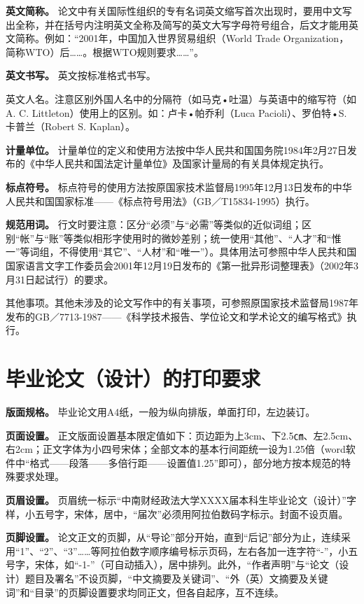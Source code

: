 \documentclass[singlesided]{Style/ucasthesis}%
\begin{document}
\textbf{英文简称。} 论文中有关国际性组织的专有名词英文缩写首次出现时，要用中文写出全称，并在括号内注明英文全称及简写的英文大写字母符号组合，后文才能用英文简称。例如：``2001年，中国加入世界贸易组织（World Trade Organization，简称WTO）后\ldots{}\ldots{}。根据WTO规则要求\ldots{}\ldots{}''。

\textbf{英文书写。} 英文按标准格式书写。

英文人名。注意区别外国人名中的分隔符（如马克•吐温）与英语中的缩写符（如A. C. Littleton）使用上的区别。如：卢卡•帕乔利（Luca Pacioli）、罗伯特•S. 卡普兰（Robert S. Kaplan）。

\textbf{计量单位。} 计量单位的定义和使用方法按中华人民共和国国务院1984年2月27日发布的《中华人民共和国法定计量单位》及国家计量局的有关具体规定执行。

\textbf{标点符号。} 标点符号的使用方法按原国家技术监督局1995年12月13日发布的中华人民共和国国家标准------《标点符号用法》（GB／T15834-1995）执行。

\textbf{规范用词。} 行文时要注意：区分``必须''与``必需''等类似的近似词组；区别``帐''与``账''等类似相形字使用时的微妙差别；统一使用``其他''、``人才''和``惟一''等词组，不得使用``其它''、``人材''和``唯一''）。具体用法可参照中华人民共和国国家语言文字工作委员会2001年12月19日发布的《第一批异形词整理表》（2002年3月31日起试行）的要求。

其他事项。其他未涉及的论文写作中的有关事项，可参照原国家技术监督局1987年发布的GB／7713-1987------《科学技术报告、学位论文和学术论文的编写格式》执行。

\hypertarget{section-32}{%
\section{毕业论文（设计）的打印要求}\label{section-32}}

\textbf{版面规格。} 毕业论文用A4纸，一般为纵向排版，单面打印，左边装订。

\textbf{页面设置。} 正文版面设置基本限定值如下：页边距为上3cm、下2.5㎝、左2.5cm、右2cm；正文字体为小四号宋体；全部文本的基本行间距统一设为1.25倍（word软件中``格式------段落------多倍行距------设置值1.25''即可），部分地方按本规范的特殊要求处理。

\textbf{页眉设置。} 页眉统一标示``中南财经政法大学XXXX届本科生毕业论文（设计）''字样，小五号字，宋体，居中，``届次''必须用阿拉伯数码字标示。封面不设页眉。

\textbf{页脚设置。} 论文正文的页脚，从``导论''部分开始，直到``后记''部分为止，连续采用``1''、``2''、``3''\ldots{}\ldots{}等阿拉伯数字顺序编号标示页码，左右各加一连字符``-''，小五号字，宋体，如``-1-''（可自动插入），居中排列。此外，``作者声明''与``论文（设计）题目及署名''不设页脚，``中文摘要及关键词''、``外（英）文摘要及关键词''和``目录''的页脚设置要求均同正文，但各自起序，互不连续。
\end{document}

